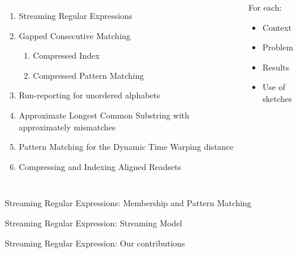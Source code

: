 \documentclass[aspectratio=169]{beamer}
\begin{document}
\begin{frame}
    \bigskip
    \begin{columns}
      \begin{enumerate}
        \item Streaming Regular Expressions
        \item Gapped Consecutive Matching
        \begin{enumerate}
            \item Compressed Index
            \item Compressed Pattern Matching
        \end{enumerate}
        \item Run-reporting for unordered alphabets
        \item Approximate Longest Common Substring with approximately     mismatches
        \item Pattern Matching for the Dynamic Time Warping distance
        \item Compressing and Indexing Aligned Readsets
      \end{enumerate}
        \begin{framed}
            For each:
            \begin{itemize}
                \item Context
                \item Problem
                \item Results
                \item Use of sketches
            \end{itemize}
        \end{framed}
    \end{columns}
\end{frame}

\begin{frame}{Streaming Regular Expressions: Membership and Pattern Matching}
    
\end{frame}

\begin{frame}{Streaming Regular Expression: Streaming Model}
    
\end{frame}

\begin{frame}{Streaming Regular Expression: Our contributions}
    
\end{frame}
\end{document}
